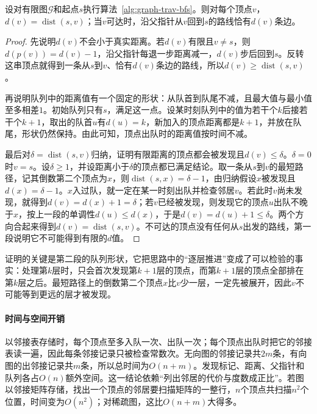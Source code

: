 \begin{theorem}[广度优先遍历的距离]
\label{thm:graph-trav-bfs-distance}
设对有限图$\mathcal G$和起点$s$执行算法~\ref{alg:graph-trav-bfs}。则对每个顶点$v$，$d(v)=\operatorname{dist}(s,v)$；当$v$可达时，沿父指针从$v$回到$s$的路线恰有$d(v)$条边。
\end{theorem}

\begin{proof}
先说明$d(v)$不会小于真实距离。若$d(v)$有限且$v\neq s$，则$d(p(v))=d(v)-1$，沿父指针每退一步距离减一，$d(v)$步后回到$s$。反转这串顶点就得到一条从$s$到$v$、恰有$d(v)$条边的路线，所以$d(v)\geq\operatorname{dist}(s,v)$。

再说明队列中的距离值有一个固定的形状：从队首到队尾不减，且最大值与最小值至多相差$1$。初始队列只有$s$，满足这一点。设某时刻队列中的值为若干个$k$后接若干个$k+1$，取出的队首$u$有$d(u)=k$，新加入的顶点距离都是$k+1$，并放在队尾，形状仍然保持。由此可知，顶点出队时的距离值按时间不减。

最后对$\delta=\operatorname{dist}(s,v)$归纳，证明有限距离的顶点都会被发现且$d(v)\leq\delta$。$\delta=0$时$v=s$。设$\delta\geq1$，并设距离小于$\delta$的顶点都已满足结论。取一条从$s$到$v$的最短路径，记其倒数第二个顶点为$x$，则$\operatorname{dist}(s,x)=\delta-1$，由归纳假设$x$被发现且$d(x)=\delta-1$。$x$入过队，就一定在某一时刻出队并检查邻居$v$。若此时$v$尚未发现，就得到$d(v)=d(x)+1=\delta$；若$v$已经被发现，则发现它的顶点$u$出队不晚于$x$，按上一段的单调性$d(u)\leq d(x)$，于是$d(v)=d(u)+1\leq\delta$。两个方向合起来得到$d(v)=\operatorname{dist}(s,v)$。不可达的顶点没有任何从$s$出发的路线，第一段说明它不可能得到有限的$d$值。
\end{proof}

证明的关键是第二段的队列形状，它把思路中的“逐层推进”变成了可以检验的事实：处理第$k$层时，只会首次发现第$k+1$层的顶点，而第$k+1$层的顶点全部排在第$k$层之后。最短路径上的倒数第二个顶点$x$比$v$少一层，一定先被展开，因此$v$不可能等到更远的层才被发现。

\paragraph{时间与空间开销}
以邻接表存储时，每个顶点至多入队一次、出队一次；每个顶点出队时把它的邻接表读一遍，因此每条邻接记录只被检查常数次。无向图的邻接记录共$2m$条，有向图的出邻接记录共$m$条，所以总时间为$O(n+m)$。发现标记、距离、父指针和队列各占$O(n)$额外空间。这一结论依赖“列出邻居的代价与度数成正比”。若图以邻接矩阵存储，找出一个顶点的邻居要扫描矩阵的一整行，$n$个顶点共扫描$n^2$个位置，时间变为$O(n^2)$；对稀疏图，这比$O(n+m)$大得多。

